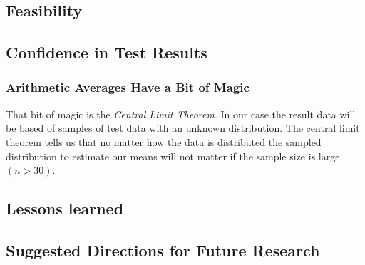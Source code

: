 \subsection{Feasibility}
\subsection{Confidence in Test Results}
\subsubsection{Arithmetic Averages Have a Bit of Magic}
That bit of magic is the \emph{Central Limit Theorem}. In our case the result data will be based of samples of test data with an unknown distribution. The central limit theorem tells us that no matter how the data is distributed the sampled distribution to estimate our means will not matter if the sample size is large $(n > 30)$.

\subsection{Lessons learned}
\subsection{Suggested Directions for Future Research}
